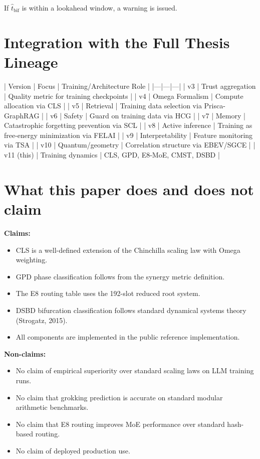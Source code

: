 \documentclass[11pt]{article}
\theoremstyle{plain}
\begin{document}
If \( \hat{t}_{\text{bif}} \) is within a lookahead window, a warning is issued.


\section{Integration with the Full Thesis Lineage}

| Version | Focus | Training/Architecture Role |
|—|—|—|
| v3 | Trust aggregation | Quality metric for training checkpoints |
| v4 | Omega Formalism | Compute allocation via CLS |
| v5 | Retrieval | Training data selection via Prisca-GraphRAG |
| v6 | Safety | Guard on training data via HCG |
| v7 | Memory | Catastrophic forgetting prevention via SCL |
| v8 | Active inference | Training as free-energy minimization via FELAI |
| v9 | Interpretability | Feature monitoring via TSA |
| v10 | Quantum/geometry | Correlation structure via EBEV/SGCE |
| v11 (this) | Training dynamics | CLS, GPD, E8-MoE, CMST, DSBD |


\section{What this paper does and does not claim}

\textbf{Claims:}
\begin{itemize}
  \item CLS is a well-defined extension of the Chinchilla scaling law with Omega weighting.
  \item GPD phase classification follows from the synergy metric definition.
  \item The E8 routing table uses the 192-slot reduced root system.
  \item DSBD bifurcation classification follows standard dynamical systems theory (Strogatz, 2015).
  \item All components are implemented in the public reference implementation.
\end{itemize}

\textbf{Non-claims:}
\begin{itemize}
  \item No claim of empirical superiority over standard scaling laws on LLM training runs.
  \item No claim that grokking prediction is accurate on standard modular arithmetic benchmarks.
  \item No claim that E8 routing improves MoE performance over standard hash-based routing.
  \item No claim of deployed production use.
\end{itemize}
\end{document}
